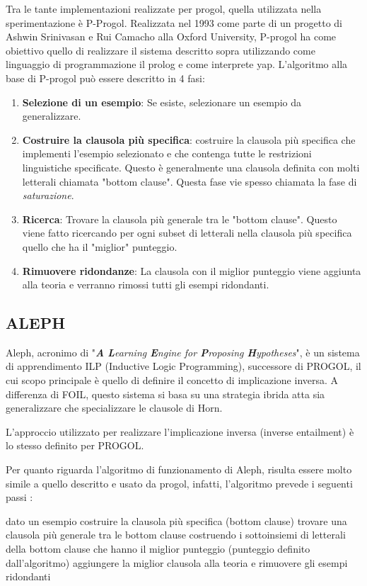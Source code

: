Tra le tante implementazioni realizzate per progol, quella utilizzata nella sperimentazione è P-Progol. Realizzata nel 1993 come parte di un progetto di Ashwin Srinivasan e Rui Camacho alla Oxford University, P-progol ha come obiettivo quello di realizzare il sistema descritto sopra utilizzando come linguaggio di programmazione il prolog e come interprete yap.
L'algoritmo alla base di P-progol può essere descritto in 4 fasi:
\begin{enumerate}
	\item \textbf{Selezione di un esempio}: Se esiste, selezionare un esempio da generalizzare.
	\item \textbf{Costruire la clausola più specifica}: costruire la clausola più specifica che implementi l'esempio selezionato e che contenga tutte le restrizioni linguistiche specificate. Questo è generalmente una clausola definita con molti letterali chiamata "bottom clause". Questa fase vie spesso chiamata la fase di \emph{saturazione}.
	\item \textbf{Ricerca}: Trovare la clausola più generale tra le "bottom clause". Questo viene fatto ricercando per ogni subset di letterali nella clausola più specifica quello che ha il "miglior" punteggio.
	\item \textbf{Rimuovere ridondanze}: La clausola con il miglior punteggio viene aggiunta alla teoria e verranno rimossi tutti gli esempi ridondanti.
\end{enumerate}

\subsection{ALEPH}
\label{sistemi:aleph}
Aleph, acronimo di "\emph{\textbf{A} \textbf{L}earning \textbf{E}ngine for \textbf{P}roposing \textbf{H}ypotheses}", è un sistema di apprendimento ILP (Inductive Logic Programming), successore di PROGOL, il cui scopo principale è quello di definire il concetto di implicazione inversa.
A differenza di FOIL, questo sistema si basa su una strategia ibrida atta sia generalizzare che specializzare le clausole di Horn. 

L'approccio utilizzato per realizzare l'implicazione inversa (inverse entailment) è lo stesso definito per PROGOL.

Per quanto riguarda l'algoritmo di funzionamento di Aleph, risulta essere molto simile a quello descritto e usato da progol, infatti, l'algoritmo prevede i seguenti passi :

\begin{algorithm}
	\begin{algorithmic}[1]
		\STATE dato un esempio costruire la clausola più specifica (bottom clause)
		\STATE trovare una clausola più generale tra le bottom clause costruendo i sottoinsiemi di letterali della bottom clause che hanno il miglior punteggio (punteggio definito dall'algoritmo)
		\STATE aggiungere la miglior clausola alla teoria e rimuovere gli esempi ridondanti 
		\ENDFOR
	\end{algorithmic}
\end{algorithm}